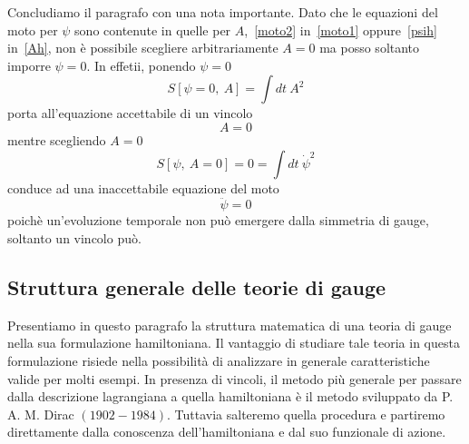     \hfill

    Concludiamo il paragrafo con una nota importante. Dato che le equazioni del moto per $\psi$ sono contenute in quelle per $A$,~\eqref{moto2} in~\eqref{moto1} oppure~\eqref{psih} in~\eqref{Ah}, non è possibile scegliere arbitrariamente $A = 0$ ma posso soltanto imporre $\psi = 0$. In effetii, ponendo $\psi = 0$ 
    \begin{equation*}
        S[\psi = 0,~A] = \int dt ~ A^2
    \end{equation*}
    porta all'equazione accettabile di un vincolo
    \begin{equation*}
        A = 0
    \end{equation*}
    mentre scegliendo $A = 0$ 
    \begin{equation*}
        S[\psi,~A=0]=0 = \int dt ~\dot \psi^2
    \end{equation*}
    conduce ad una inaccettabile equazione del moto 
    \begin{equation*}
        \ddot \psi = 0
    \end{equation*}
    poichè un'evoluzione temporale non può emergere dalla simmetria di gauge, soltanto un vincolo può.

\subsection{Struttura generale delle teorie di gauge} 

    Presentiamo in questo paragrafo la struttura matematica di una teoria di gauge nella sua formulazione hamiltoniana. Il vantaggio di studiare tale teoria in questa formulazione risiede nella possibilità di analizzare in generale caratteristiche valide per molti esempi. In presenza di vincoli, il metodo più generale per passare dalla descrizione lagrangiana a quella hamiltoniana è il metodo sviluppato da P. A. M. Dirac $(1902- 1984)$. Tuttavia salteremo quella procedura e partiremo direttamente dalla conoscenza dell'hamiltoniana e dal suo funzionale di azione. 
    
